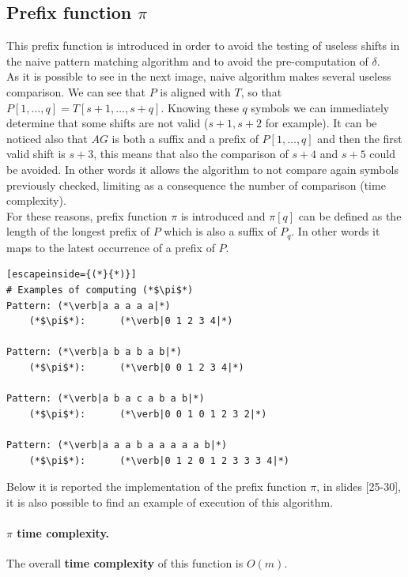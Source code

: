 \subsection{Prefix function $\pi$}
This prefix function is introduced in order to avoid the testing of useless shifts in the naive pattern matching algorithm and to avoid the pre-computation of $\delta$.\\
As it is possible to see in the next image, naive algorithm makes several useless comparison.
We can see that $P$ is aligned with $T$, so that $P[1, \dots, q] = T[s+1, \dots, s+q]$. Knowing these $q$ symbols we can immediately determine that some shifts are not valid ($s+1, s+2$ for example). It can be noticed also that $AG$ is both a suffix and a prefix of $P[1, \dots, q]$ and then the first valid shift is $s+3$, this means that also the comparison of $s+4$ and $s+5$ could be avoided. In other words it allows the algorithm to not compare again symbols previously checked, limiting as a consequence the number of comparison (time complexity). \\
For these reasons, prefix function $\pi$ is introduced and $\pi[q]$ can be defined as the length of the longest prefix of $P$ which is also a suffix of $P_q$. In other words it maps to the latest occurrence of a prefix of $P$.

\begin{lstlisting}[escapeinside={(*}{*)}]
# Examples of computing (*$\pi$*)  
Pattern: (*\verb|a a a a a|*)
	(*$\pi$*):	    (*\verb|0 1 2 3 4|*)

Pattern: (*\verb|a b a b a b|*)
	(*$\pi$*):	    (*\verb|0 0 1 2 3 4|*)

Pattern: (*\verb|a b a c a b a b|*)
	(*$\pi$*):	    (*\verb|0 0 1 0 1 2 3 2|*)

Pattern: (*\verb|a a a b a a a a a b|*)
	(*$\pi$*):	    (*\verb|0 1 2 0 1 2 3 3 3 4|*)
\end{lstlisting}
Below it is reported the implementation of the prefix function $\pi$, in slides [25-30], it is also possible to find an example of execution of this algorithm.
\paragraph*{$\pi$ time complexity.} The overall \textbf{time complexity} of this function is $O(m)$.

